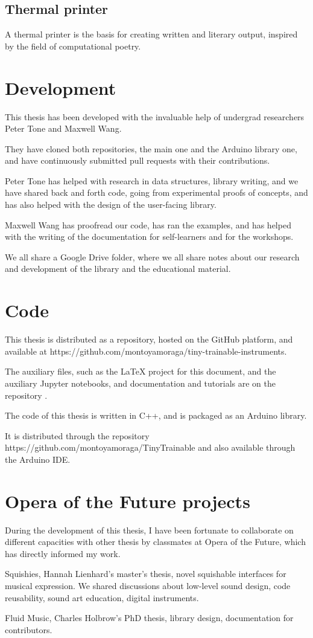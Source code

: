 \subsection{Thermal printer}

A thermal printer is the basis for creating written and literary output, inspired by the field of computational poetry.

\section{Development}

This thesis has been developed with the invaluable help of undergrad researchers Peter Tone and Maxwell Wang.

They have cloned both repositories, the main one and the Arduino library one, and have continuously submitted pull requests with their contributions.

Peter Tone has helped with research in data structures, library writing, and we have shared back and forth code, going from experimental proofs of concepts, and has also helped with the design of the user-facing library.

Maxwell Wang has proofread our code, has ran the examples, and has helped with the writing of the documentation for self-learners and for the workshops.

We all share a Google Drive folder, where we all share notes about our research and development of the library and the educational material.

\section{Code}

This thesis is distributed as a repository, hosted on the GitHub platform, and available at https://github.com/montoyamoraga/tiny-trainable-instruments.



The auxiliary files, such as the LaTeX project for this document, and the auxiliary Jupyter notebooks, and documentation and tutorials are on the repository .


The code of this thesis is written in C++, and is packaged as an Arduino library.

It is distributed through the repository https://github.com/montoyamoraga/TinyTrainable and also available through the Arduino IDE.


\section{Opera of the Future projects}

During the development of this thesis, I have been fortunate to collaborate on different capacities with other thesis by classmates at Opera of the Future, which has directly informed my work.

Squishies, Hannah Lienhard's master's thesis, novel squishable interfaces for musical expression. We shared discussions about low-level sound design, code reusability, sound art education, digital instruments.

Fluid Music, Charles Holbrow's PhD thesis, library design, documentation for contributors.
